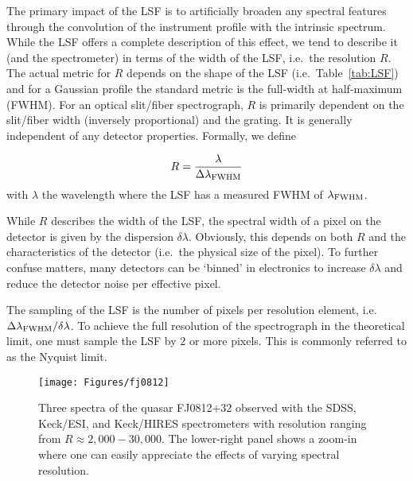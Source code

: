 \documentclass[graybox]{svmult}
\begin{document}
The primary impact of the LSF is to artificially broaden
any spectral features through the convolution of the instrument
profile with the intrinsic spectrum.  While the LSF offers a
complete description of this effect, we tend to describe it
(and the spectrometer) in terms of the width of the LSF, 
i.e.\ the resolution $R$.
The actual metric for $R$ depends on the shape of the 
LSF (i.e.\ Table~\ref{tab:LSF}) and for a Gaussian profile
the standard metric is the full-width at half-maximum (FWHM).
For an optical slit/fiber spectrograph, $R$ is primarily 
dependent on the slit/fiber width (inversely proportional)
and the grating.  It is generally independent of any detector
properties.  Formally, we define

\begin{equation}
R = \frac{\lambda}{\Delta\lambda_{\rm FWHM}}
\label{eqn:R}
\end{equation}
with $\lambda$ the wavelength where the LSF has a measured
FWHM of $\lambda_{\rm FWHM}$.

While $R$ describes the width of the LSF, the spectral
width of a pixel on the detector is given by the dispersion
$\delta \lambda$.  Obviously, this depends on both $R$ 
and the characteristics of the detector (i.e.\ the
physical size of the pixel).  To further confuse matters,
many detectors can be `binned' in electronics
to increase $\delta\lambda$ and reduce the detector noise
per effective pixel.  

The sampling of the LSF is the number of pixels per resolution element,
i.e.\  $\Delta\lambda_{\rm FWHM} / \delta\lambda$.  To achieve the
full resolution of the spectrograph in the theoretical limit,
one must sample the LSF by 2 or more pixels.  This is commonly
referred to as the Nyquist limit.  


%
\begin{figure}[b]
\sidecaption
\texttt{[image: Figures/fj0812]}
%
%
\caption{Three spectra of the quasar FJ0812+32 observed with the
SDSS, Keck/ESI, and Keck/HIRES spectrometers with resolution ranging
from $R \approx 2,000 - 30,000$.  The lower-right panel shows
a zoom-in where one can easily appreciate the effects of varying
spectral resolution.
}
\label{fig:R}       %
\end{figure}
\end{document}
